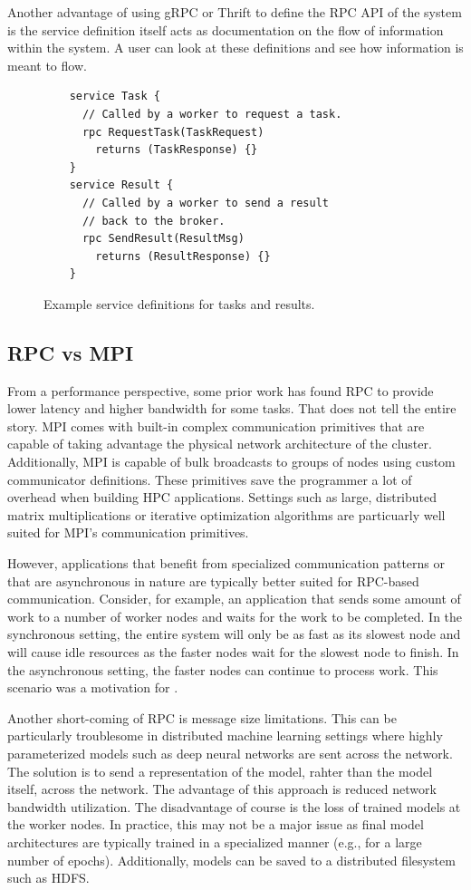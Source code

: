 \documentclass[conference]{IEEEtran}
\begin{document}
Another advantage of using gRPC or Thrift to define the RPC API of the system is
the service definition itself acts as documentation on the flow of information
within the system. A user can look at these definitions and see how information
is meant to flow.

\begin{figure}
  \begin{lstlisting}
    service Task {
      // Called by a worker to request a task.
      rpc RequestTask(TaskRequest)
        returns (TaskResponse) {}
    }
    service Result {
      // Called by a worker to send a result
      // back to the broker.
      rpc SendResult(ResultMsg)
        returns (ResultResponse) {}
    }
  \end{lstlisting}
  \caption{Example service definitions for tasks and results.}
  \label{fig:task-result-services}
\end{figure}

\subsection{RPC vs MPI}
From a performance perspective, some prior work \cite{rpc-perf} has found RPC to
provide lower latency and higher bandwidth for some tasks. That does not tell
the entire story. MPI comes with built-in complex communication primitives that
are capable of taking advantage the physical network architecture of the
cluster. Additionally, MPI is capable of bulk broadcasts to groups of nodes
using custom communicator definitions. These primitives save the programmer a
lot of overhead when building HPC applications. Settings such as large,
distributed matrix multiplications or iterative optimization algorithms are
particuarly well suited for MPI's communication primitives.

However, applications that benefit from specialized communication patterns or
that are asynchronous in nature are typically better suited for RPC-based
communication. Consider, for example, an application that sends some amount of
work to a number of worker nodes and waits for the work to be completed. In the
synchronous setting, the entire system will only be as fast as its slowest node
and will cause idle resources as the faster nodes wait for the slowest node to
finish. In the asynchronous setting, the faster nodes can continue to process
work. This scenario was a motivation for \cite{40565}.

Another short-coming of RPC is message size limitations. This can be particularly
troublesome in distributed machine learning settings where highly parameterized
models such as deep neural networks are sent across the network. The solution
is to send a representation of the model, rahter than the model itself, across
the network. The advantage of this approach is reduced network bandwidth
utilization. The disadvantage of course is the loss of trained models at the
worker nodes. In practice, this may not be a major issue as final model
architectures are typically trained in a specialized manner (e.g., for a large
number of epochs). Additionally, models can be saved to a distributed filesystem
such as HDFS.
\end{document}
